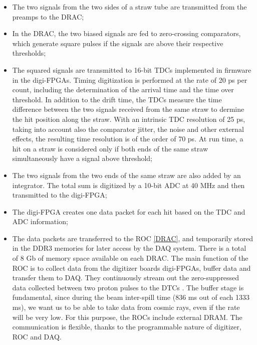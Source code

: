 \begin{itemize}
    \item The two signals from the two sides of a straw tube are transmitted 
    from the preamps to the DRAC;
    \item In the DRAC, the two biased signals are fed to zero-crossing comparators, 
    which generate square pulses if the signals are above their respective thresholds;
    \item The squared signals are transmitted to 16-bit TDCs implemented 
    in firmware in the digi-FPGAs. Timing digitization is performed at the rate 
    of 20 ps per count, including the determination of the arrival time and the 
    time over threshold. In addition to the drift time, the TDCs 
    measure the time difference between the two signals received from the 
    same straw to dermine the hit position along the straw. With an 
    intrinsic TDC resolution of 25 ps, taking into account also the comparator jitter, 
    the noise and other external effects, the resulting time resolution 
    is of the order of 70 ps. At run time, a hit on a straw 
    is considered only if both ends of the same straw simultaneously have a 
    signal above threshold;
    \item The two signals from the two ends of the same straw are also 
    added by an integrator. The total sum is digitized by a 10-bit 
    ADC at 40 MHz and then transmitted to the digi-FPGA;
    \item The digi-FPGA creates one data packet for each hit based on the 
    TDC and ADC information;
    \item The data packets are transferred to the ROC \ref{DRAC}, and 
    temporarily stored in the DDR3 memories for later access by the DAQ system. 
    There is a total of 8 Gb of memory space available on each DRAC. 
    The main function of the ROC is to collect data from the digitizer boards 
    digi-FPGAs, buffer data and transfer them to DAQ. They continuously stream out 
    the zero-suppressed data collected between two proton pulses to the DTCs \cite{GIOIOSA2023167732}. The buffer stage is fundamental, 
    since during the beam inter-spill time (836 ms out of each 1333 ms), 
    we want us to be able to take data from cosmic rays, even if the rate 
    will be very low. For this purpose, the ROCs include external DRAM. 
    The communication is flexible, thanks to the 
    programmable nature of digitizer, ROC and DAQ.
\end{itemize}


